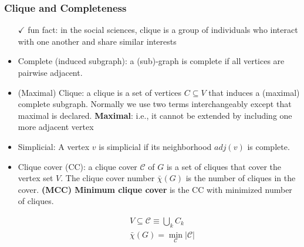 \documentclass[../main]{subfiles}
\begin{document}
\subsubsection*{Clique and Completeness}
\begin{itemize}
      \item[\(\checkmark\)] fun fact: in the social sciences, clique is a group of individuals who interact with one another and share similar interests
      \item Complete (induced subgraph): a (sub)-graph is complete if all vertices are pairwise adjacent.
      \item (Maximal) Clique: a clique is a set of vertices \(C \subseteq V\) that induces a (maximal) complete subgraph. Normally we use two terms interchangeably except that maximal is declared. \textbf{Maximal}: i.e., it cannot be extended by including one more adjacent vertex
      \item Simplicial: A vertex \(v\) is simplicial if its neighborhood \(adj(v)\) is complete.
      \item Clique cover (CC): a clique cover \(\mathscr C\) of \(G\) is a set of
            cliques that cover the vertex set \(V\). The clique cover number
            \(\bar \chi (G)\) is the number of cliques in the cover. \textbf{(MCC) Minimum clique cover} is the CC with minimized number of cliques.

            \begin{equation}
                  \begin{aligned}
                         & V \subseteq \mathscr C \equiv \bigcup_k C_k    \\
                         & \bar \chi (G) = \min_{\mathscr C} |\mathscr C|
                  \end{aligned}
            \end{equation}


\end{itemize}
\end{document}
